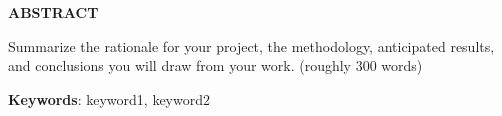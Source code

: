 \thispagestyle{plain}
\begin{center}
    \Large \textbf{\textcolor{GUBGreen}{ABSTRACT}}
\end{center}
\vspace{3\baselineskip}
\noindent
 Summarize the rationale for your project, the methodology, anticipated results, and conclusions you will draw from your work. (roughly 300 words)


\vspace{\baselineskip}
\noindent
\textbf{Keywords}: keyword1, keyword2

